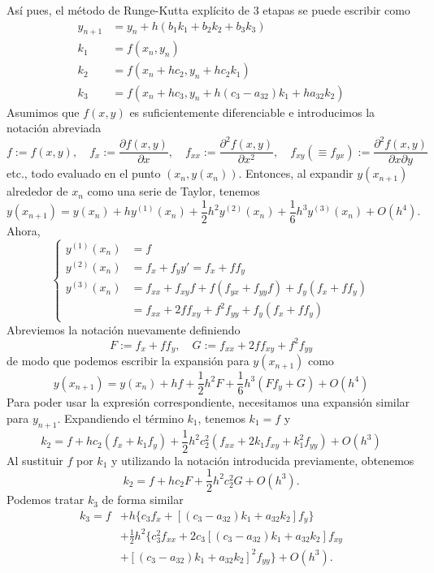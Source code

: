 As\'i pues, el método de Runge-Kutta explícito de 3 etapas se puede escribir como   
$$ \begin{aligned}     y_{n+1} &= y_n + h(b_1 k_1 + b_2 k_2 + b_3 k_3) \\     k_1 &= f(x_n, y_n) \\     k_2 &= f(x_n + h c_2, y_n + h c_2 k_1) \\     k_3 &= f(x_n + h c_3, y_n + h(c_3 - a_{32})k_1 + h a_{32} k_2) \end{aligned}$$
Asumimos que $f(x, y)$ es suficientemente diferenciable e introducimos la notación abreviada   
$$f := f(x, y), \quad f_x := \frac{\partial f(x,y)}{\partial x}, \quad f_{xx} := \frac{\partial^2 f(x,y)}{\partial x^2}, \quad f_{xy} (\equiv f_{yx}) := \frac{\partial^2 f(x,y)}{\partial x \partial y}$$ 
etc., todo evaluado en el punto $(x_n, y(x_n))$. Entonces, al expandir $y(x_{n+1})$ alrededor de $x_n$ como una serie de Taylor, tenemos   $$y(x_{n+1}) = y(x_n) + h y^{(1)}(x_n) + \frac{1}{2}h^2 y^{(2)}(x_n) + \frac{1}{6}h^3 y^{(3)}(x_n) + O(h^4).$$
Ahora,   
$$\left\{ \begin{aligned}     y^{(1)}(x_n) &= f \\     y^{(2)}(x_n) &= f_x + f_y y' = f_x + f f_y \\     y^{(3)}(x_n) &= f_{xx} + f_{xy} f + f(f_{yx} + f_{yy} f) + f_y(f_x + f f_y) \\     &= f_{xx} + 2f f_{xy} + f^2 f_{yy} + f_y(f_x + f f_y) \end{aligned} \right.$$
Abreviemos la notación nuevamente definiendo   
$$F := f_x + f f_y, \quad G := f_{xx} + 2f f_{xy} + f^2 f_{yy}$$
de modo que podemos escribir la expansión para $y(x_{n+1})$ como   
$$y(x_{n+1}) = y(x_n) + hf + \frac{1}{2}h^2 F + \frac{1}{6}h^3 (F f_y + G) + O(h^4)$$
Para poder usar la expresión correspondiente, necesitamos una expansión similar para $y_{n+1}$. Expandiendo el término $k_1$, tenemos $k_1 = f$ y   $$k_2 = f + h c_2 (f_x + k_1 f_y) + \frac{1}{2}h^2 c_2^2 (f_{xx} + 2k_1 f_{xy} + k_1^2 f_{yy}) + O(h^3)$$
Al sustituir $f$ por $k_1$ y utilizando la notación introducida previamente, obtenemos   
$$k_2 = f + h c_2 F + \frac{1}{2}h^2 c_2^2 G + O(h^3).$$
Podemos tratar $k_3$ de forma similar   
$$\begin{aligned} k_3 = f &+ h \{c_3 f_x + [(c_3 - a_{32})k_1 + a_{32}k_2]f_y\} \\ &+ \frac{1}{2}h^2 \{c_3^2 f_{xx} + 2c_3 [(c_3 - a_{32})k_1 + a_{32}k_2] f_{xy} \\ &+ [(c_3 - a_{32})k_1 + a_{32}k_2]^2 f_{yy}\} + O(h^3). \end{aligned}$$
